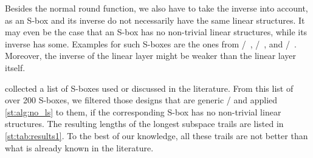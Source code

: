 Besides the normal round function, we also have to take the inverse into account, as an S-box and its inverse do not necessarily have the same linear structures.
It may even be the case that an S-box has no non-trivial linear structures, while its inverse has some.
Examples for such S-boxes are the ones from \safer/~, /~, and \fides/~.
Moreover, the inverse of the linear layer might be weaker than the linear layer itself.

\textcite{PhD:Perrin17} collected a list of S-boxes used or discussed in the literature.
From this list of over 200 S-boxes, we filtered those designs that are generic \SPNp/ and applied \cref{st:alg:no_ls} to them, if the corresponding S-box has no non-trivial linear structures.
The resulting lengths of the longest subspace trails are listed in \cref{st:tab:results1}.
To the best of our knowledge, all these trails are not better than what is already known in the literature.

